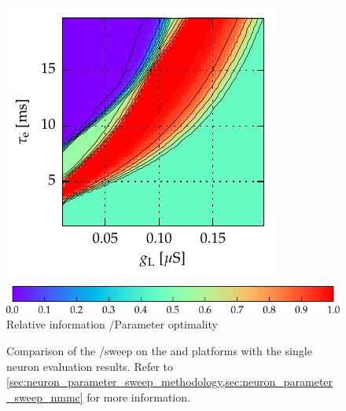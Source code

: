 \begin{figure}[t]
{		\includegraphics[trim=2mm 3mm 2mm 2.2mm,clip]{media/chp5/nmmc/i3_ex_nm_Train_N100_XgL_YtauE_pBin_Train_IfCondExp_small.pdf}%
		\hspace{3.9mm}%
		\label{fig:exp_stI}
	}%
	\hspace*{7mm}\includegraphics{media/chp5/colorbar_info.pdf}
	{\footnotesize Relative information \info/Parameter optimality \Pgen}
	\caption[First NM-MC1 and NEST neuron parameter sweep]{Comparison of the \Gl/\TauE sweep on the \NEST and \NMMC platforms with the single neuron evaluation results. Refer to \cref{sec:neuron_parameter_sweep_methodology,sec:neuron_parameter_sweep_nmmc} for more information.}
	\label{fig:exp_sweepI}
\end{figure}

